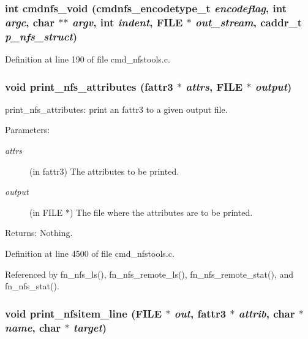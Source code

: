 \subsubsection{\setlength{\rightskip}{0pt plus 5cm}int cmdnfs\_\-void ({\bf cmdnfs\_\-encodetype\_\-t} {\em encodeflag}, int {\em argc}, char $\ast$$\ast$ {\em argv}, int {\em indent}, FILE $\ast$ {\em out\_\-stream}, caddr\_\-t {\em p\_\-nfs\_\-struct})}\label{cmd__nfstools_8h_a15}




Definition at line 190 of file cmd\_\-nfstools.c.
\subsubsection{\setlength{\rightskip}{0pt plus 5cm}void print\_\-nfs\_\-attributes (fattr3 $\ast$ {\em attrs}, FILE $\ast$ {\em output})}\label{cmd__nfstools_8h_a69}


print\_\-nfs\_\-attributes: print an fattr3 to a given output file.

\begin{Desc}
\item[Parameters:]
\begin{description}
\item[{\em attrs}](in fattr3) The attributes to be printed. \item[{\em output}](in FILE $\ast$) The file where the attributes are to be printed. \end{description}
\end{Desc}
\begin{Desc}
\item[Returns:]Nothing. \end{Desc}


Definition at line 4500 of file cmd\_\-nfstools.c.

Referenced by fn\_\-nfs\_\-ls(), fn\_\-nfs\_\-remote\_\-ls(), fn\_\-nfs\_\-remote\_\-stat(), and fn\_\-nfs\_\-stat().
\subsubsection{\setlength{\rightskip}{0pt plus 5cm}void print\_\-nfsitem\_\-line (FILE $\ast$ {\em out}, fattr3 $\ast$ {\em attrib}, char $\ast$ {\em name}, char $\ast$ {\em target})}\label{cmd__nfstools_8h_a68}


